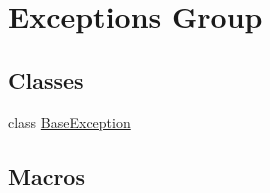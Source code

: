 \hypertarget{group__EXCEPT__GROUP}{}\section{Exceptions Group}
\label{group__EXCEPT__GROUP}
\subsection*{Classes}
\begin{DoxyCompactItemize}
\item 
class \hyperlink{classBaseException}{Base\+Exception}
\end{DoxyCompactItemize}
\subsection*{Macros}
